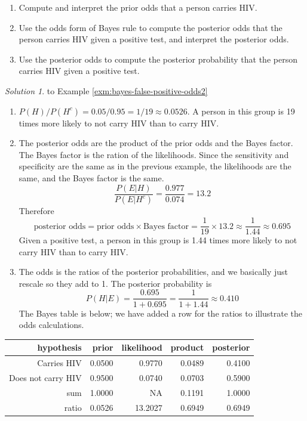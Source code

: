\documentclass[
]{book}
\providecommand{\tightlist}{%
  \setlength{\itemsep}{0pt}\setlength{\parskip}{0pt}}
\theoremstyle{definition}
\theoremstyle{definition}
\theoremstyle{definition}
\theoremstyle{remark}
\newtheorem*{solution}{Solution}
\begin{document}
\begin{enumerate}
\def\labelenumi{\arabic{enumi}.}
\tightlist
\item
  Compute and interpret the prior odds that a person carries HIV.
\item
  Use the odds form of Bayes rule to compute the posterior odds that the person carries HIV given a positive test, and interpret the posterior odds.
\item
  Use the posterior odds to compute the posterior probability that the person carries HIV given a positive test.
\end{enumerate}

\begin{solution}
{}
to Example \ref{exm:bayes-false-positive-odds2}
\end{solution}

\begin{enumerate}
\def\labelenumi{\arabic{enumi}.}
\tightlist
\item
  \(P(H)/P(H^c) = 0.05/0.95 = 1/19 \approx 0.0526\). A person in this group is 19 times more likely to not carry HIV than to carry HIV.
\item
  The posterior odds are the product of the prior odds and the Bayes factor. The Bayes factor is the ration of the likelihoods. Since the sensitivity and specificity are the same as in the previous example, the likelihoods are the same, and the Bayes factor is the same.
  \[
   \frac{P(E|H)}{P(E|H^c)} = \frac{0.977}{0.074} = 13.2
  \]
  Therefore
  \[
  \text{posterior odds} = \text{prior odds} \times \text{Bayes factor} = \frac{1}{19} \times 13.2 \approx \frac{1}{1.44} \approx 0.695
  \]
  Given a positive test, a person in this group is 1.44 times more likely to not carry HIV than to carry HIV.
\item
  The odds is the ratios of the posterior probabilities, and we basically just rescale so they add to 1. The posterior probability is
  \[
  P(H|E) = \frac{0.695}{1 + 0.695} = \frac{1}{1 + 1.44} \approx 0.410
  \]
  The Bayes table is below; we have added a row for the ratios to illustrate the odds calculations.
\end{enumerate}

\begin{tabular}{r|r|r|r|r}
\hline
hypothesis & prior & likelihood & product & posterior\\
\hline
Carries HIV & 0.0500 & 0.9770 & 0.0489 & 0.4100\\
\hline
Does not carry HIV & 0.9500 & 0.0740 & 0.0703 & 0.5900\\
\hline
sum & 1.0000 & NA & 0.1191 & 1.0000\\
\hline
ratio & 0.0526 & 13.2027 & 0.6949 & 0.6949\\
\hline
\end{tabular}
\end{document}
